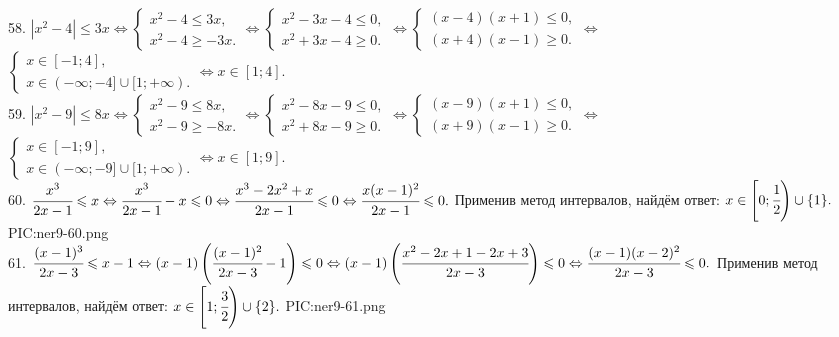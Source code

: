 58. $|x^2-4|\leqslant3x\Leftrightarrow \begin{cases} x^2-4\leqslant3x,\\ x^2-4\geqslant-3x.\end{cases}\Leftrightarrow \begin{cases} x^2-3x-4\leqslant0,\\ x^2+3x-4\geqslant0.\end{cases}\Leftrightarrow \begin{cases} (x-4)(x+1)\leqslant0,\\ (x+4)(x-1)\geqslant0.\end{cases}
\Leftrightarrow$\\$ \begin{cases} x\in[-1;4],\\ x\in(-\infty;-4]\cup[1;+\infty).\end{cases}\Leftrightarrow x\in[1;4].$\\
59. $|x^2-9|\leqslant8x\Leftrightarrow \begin{cases} x^2-9\leqslant8x,\\ x^2-9\geqslant-8x.\end{cases}\Leftrightarrow \begin{cases} x^2-8x-9\leqslant0,\\ x^2+8x-9\geqslant0.\end{cases}\Leftrightarrow \begin{cases} (x-9)(x+1)\leqslant0,\\ (x+9)(x-1)\geqslant0.\end{cases}
\Leftrightarrow$\\$ \begin{cases} x\in[-1;9],\\ x\in(-\infty;-9]\cup[1;+\infty).\end{cases}\Leftrightarrow x\in[1;9].$\\
60. $\cfrac{x^3}{2x-1}\leqslant x\Leftrightarrow\cfrac{x^3}{2x-1}-x\leqslant0\Leftrightarrow \cfrac{x^3-2x^2+x}{2x-1}\leqslant0\Leftrightarrow
\cfrac{x(x-1)^2}{2x-1}\leqslant0.$ Применив метод интервалов, найдём ответ: $x\in\left[0;\cfrac{1}{2}\right)\cup\{1\}.$
{{PIC:ner9-60.png}}\\
61. $\cfrac{(x-1)^3}{2x-3}\leqslant x-1\Leftrightarrow (x-1)\left(\cfrac{(x-1)^2}{2x-3}-1\right)\leqslant0\Leftrightarrow
(x-1)\left(\cfrac{x^2-2x+1-2x+3}{2x-3}\right)\leqslant0\Leftrightarrow\cfrac{(x-1)(x-2)^2}{2x-3}\leqslant0.$ Применив метод интервалов, найдём ответ: $x\in\left[1;\cfrac{3}{2}\right)\cup\{2\}.$
{{PIC:ner9-61.png}}\\
